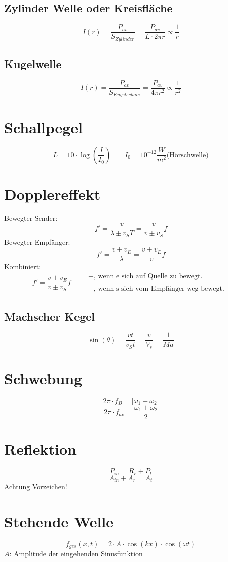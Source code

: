 \subsection{Zylinder Welle oder Kreisfläche}
\[ \boxed{I(r) = \frac{P_{av}}{S_{Zylinder}} = \frac{P_{av}}{L \cdot 2 \pi r} 
\propto \frac{1}{r}} \]
\subsection{Kugelwelle}
\[ \boxed{I(r) = \frac{P_{av}}{S_{Kugelschale}} = \frac{P_{av}}{4 \pi r^2} 
\propto \frac{1}{r^2}} \]

\section{Schallpegel}
\[ \boxed{L = 10 \cdot \log\left(\frac{I}{I_0}\right)} 
\qquad I_0 = 10^{-12} \frac{W}{m^2} \text{(Hörschwelle)} \]

\section{Dopplereffekt}
Bewegter Sender: 
\[ \boxed{f' = \frac{v}{\lambda \pm v_S T} = \frac{v}{v \pm v_S}f} \]
Bewegter Empfänger: 
\[ \boxed{f' = \frac{v \pm v_E}{\lambda} = \frac{v \pm v_E}{v}f} \]
Kombiniert: 
\[ \boxed{f' = \frac{v \pm v_E}{v \pm v_S}f} \qquad \substack{\text{
$+$, wenn e sich auf Quelle zu bewegt. }\\\\\text{
$+$, wenn s sich vom Empfänger weg bewegt. }} \]

\subsection{Machscher Kegel}
\[ \boxed{\sin(\theta) = \frac{v t}{v_S t} = \frac{v}{V_s} = \frac{1}{Ma}} \]

\section{Schwebung}
\[ \boxed{2 \pi \cdot f_B = |\omega_1 - \omega_2|} \]
\[ \boxed{2 \pi \cdot f_{av} = \frac{\omega_1 + \omega_2}{2}} \]

\section{Reflektion}
\[ \boxed{P_{in} = R_r + P_t} \]
\[ \boxed{A_{in} + A_r = A_t} \]
Achtung Vorzeichen!

\section{Stehende Welle}
\[ \boxed{f_{ges}(x,t) = 2 \cdot A \cdot \cos(k x) \cdot \cos(\omega t)} \]
$A$: Amplitude der eingehenden Sinusfunktion \\

